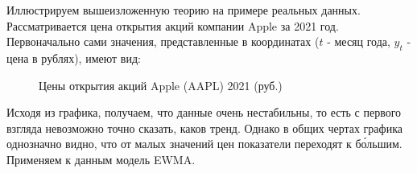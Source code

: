 			Иллюстрируем вышеизложенную теорию на примере реальных данных. Рассматривается цена открытия акций компании Apple за 2021 год. Первоначально сами значения, представленные в координатах ($t$ - месяц года, $y_t$ - цена в рублях), имеют вид:
			\begin{figure}[H]
				\centering
				\caption{Цены открытия акций Apple (AAPL) 2021 (руб.)}
			\end{figure}
			Исходя из графика, получаем, что данные очень нестабильны, то есть с первого взгляда невозможно точно сказать, каков тренд. Однако в общих чертах графика однозначно видно, что от малых значений цен показатели переходят к б\'{о}льшим. Применяем к данным модель EWMA.
